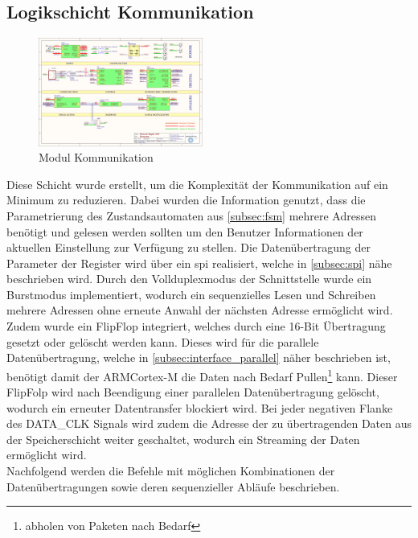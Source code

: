 \subsection{Logikschicht Kommunikation}
\begin{figure}[h!]
	\centering
	\includegraphics[page=11,width=0.48\textwidth, trim=58mm 99mm 185mm 53mm, clip=true]{images/pcb/new.PDF}%
	\caption{Modul Kommunikation}
	\label{fig:layer_com}
\end{figure}
Diese Schicht wurde erstellt, um die Komplexität der Kommunikation auf ein Minimum zu reduzieren. Dabei wurden die Information genutzt, dass die Parametrierung des Zustandsautomaten aus \autoref{subsec:fsm} mehrere Adressen benötigt und gelesen werden sollten um den Benutzer Informationen der aktuellen Einstellung zur Verfügung zu stellen. Die Datenübertragung der Parameter der Register wird über ein \ac{spi} realisiert, welche in \autoref{subsec:spi} nähe beschrieben wird. Durch den Vollduplexmodus der Schnittstelle wurde ein Burstmodus implementiert, wodurch ein sequenzielles Lesen und Schreiben mehrere Adressen ohne erneute Anwahl der nächsten Adresse ermöglicht wird.\\
Zudem wurde ein FlipFlop integriert, welches durch eine 16-Bit Übertragung gesetzt oder gelöscht werden kann. Dieses wird für die parallele Datenübertragung, welche in \autoref{subsec:interface_parallel} näher beschrieben ist, benötigt damit der ARM\SymbReg Cortex\SymbReg-M die Daten nach Bedarf Pullen\footnote{abholen von Paketen nach Bedarf} kann. Dieser FlipFolp wird nach Beendigung einer parallelen Datenübertragung gelöscht, wodurch ein erneuter Datentransfer blockiert wird. 
Bei jeder negativen Flanke des DATA\_CLK Signals wird zudem die Adresse der zu übertragenden Daten aus der Speicherschicht weiter geschaltet, wodurch ein Streaming der Daten ermöglicht wird.\\
Nachfolgend werden die Befehle mit möglichen Kombinationen der Datenübertragungen sowie deren sequenzieller Abläufe beschrieben.
